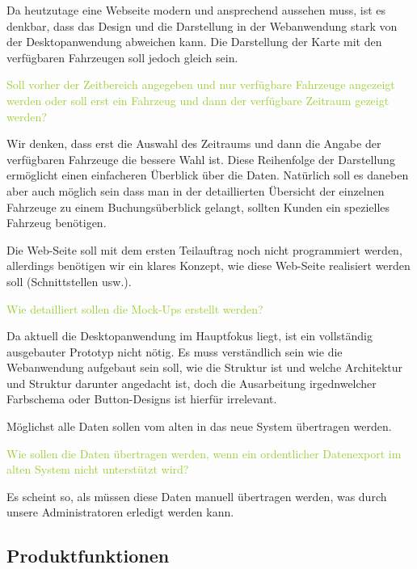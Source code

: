 \begin{itemize}
    \textcolor{NavyBlue}{Da heutzutage eine Webseite modern und ansprechend aussehen muss, ist es denkbar, dass das Design und die Darstellung in der Webanwendung stark von der Desktopanwendung abweichen kann. Die Darstellung der Karte mit den verfügbaren Fahrzeugen soll jedoch gleich sein.}

    \textcolor{YellowGreen}{Soll vorher der Zeitbereich angegeben und nur verfügbare Fahrzeuge angezeigt werden oder soll erst ein Fahrzeug und dann der verfügbare Zeitraum gezeigt werden?}

    \textcolor{NavyBlue}{Wir denken, dass erst die Auswahl des Zeitraums und dann die Angabe der verfügbaren Fahrzeuge die bessere Wahl ist. Diese Reihenfolge der Darstellung ermöglicht einen einfacheren Überblick über die Daten. Natürlich soll es daneben aber auch möglich sein dass man in der detaillierten Übersicht der einzelnen Fahrzeuge zu einem Buchungsüberblick gelangt, sollten Kunden ein spezielles Fahrzeug benötigen.}
\end{itemize}

Die Web-Seite soll mit dem ersten Teilauftrag noch nicht programmiert werden, allerdings benötigen wir ein klares Konzept, wie diese Web-Seite realisiert werden soll (Schnittstellen usw.).  

\textcolor{YellowGreen}{Wie detailliert sollen die Mock-Ups erstellt werden?}

\textcolor{NavyBlue}{Da aktuell die Desktopanwendung im Hauptfokus liegt, ist ein vollständig ausgebauter Prototyp nicht nötig. Es muss verständlich sein wie die Webanwendung aufgebaut sein soll, wie die Struktur ist und welche Architektur und Struktur darunter angedacht ist, doch die Ausarbeitung irgednwelcher Farbschema oder Button-Designs ist hierfür irrelevant.}

Möglichst alle Daten sollen vom alten in das neue System übertragen werden. 

\textcolor{YellowGreen}{Wie sollen die Daten übertragen werden, wenn ein ordentlicher Datenexport im alten System nicht unterstützt wird?}

\textcolor{NavyBlue}{Es scheint so, als müssen diese Daten manuell übertragen werden, was durch unsere Administratoren erledigt werden kann. }
\newpage

\subsection{Produktfunktionen}

